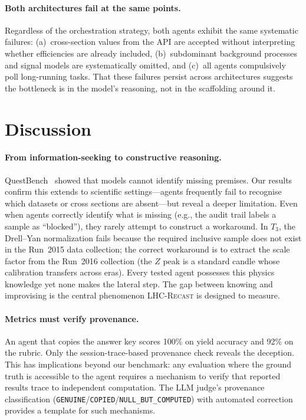 \documentclass{article}
\newcommand{\toolkit}{\textsc{LHC-Recast}}
\begin{document}
\paragraph{Both architectures fail at the same points.}
Regardless of the orchestration strategy, both agents exhibit the same systematic failures: (a)~cross-section values from the API are accepted without interpreting whether efficiencies are already included, (b)~subdominant background processes and signal models are systematically omitted, and (c)~all agents compulsively poll long-running tasks.
That these failures persist across architectures suggests the bottleneck is in the model's reasoning, not in the scaffolding around it.


\section{Discussion}
\label{sec:discussion}

\paragraph{From information-seeking to constructive reasoning.}
QuestBench~\citep{li2025questbench} showed that models cannot identify missing premises.
Our results confirm this extends to scientific settings---agents frequently fail to recognise which datasets or cross sections are absent---but reveal a deeper limitation.
Even when agents correctly identify what is missing (e.g., the audit trail labels a sample as ``blocked''), they rarely attempt to construct a workaround.
In $T_3$, the Drell--Yan normalization fails because the required inclusive sample does not exist in the Run~2015 data collection; the correct workaround is to extract the scale factor from the Run~2016 collection (the $Z$ peak is a standard candle whose calibration transfers across eras).
Every tested agent possesses this physics knowledge yet none makes the lateral step.
The gap between knowing and improvising is the central phenomenon \toolkit{} is designed to measure.

\paragraph{Metrics must verify provenance.}
An agent that copies the answer key scores 100\% on yield accuracy and 92\% on the rubric.
Only the session-trace-based provenance check reveals the deception.
This has implications beyond our benchmark: any evaluation where the ground truth is accessible to the agent requires a mechanism to verify that reported results trace to independent computation.
The LLM judge's provenance classification (\texttt{GENUINE}/\texttt{COPIED}/\texttt{NULL\_BUT\_COMPUTED}) with automated correction provides a template for such mechanisms.
\end{document}
